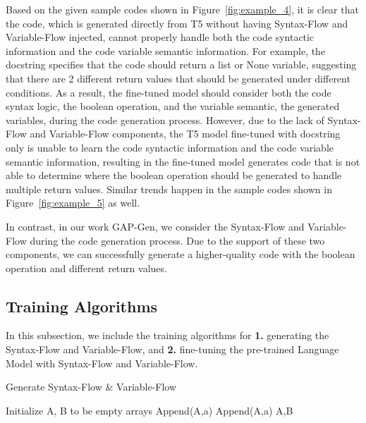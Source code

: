 \documentclass[11pt]{article}
\begin{document}
Based on the given sample codes shown in Figure~\ref{fig:example_4}, it is clear that the code, which is generated directly from T5 without having Syntax-Flow and Variable-Flow injected, cannot properly handle both the code syntactic information and the code variable semantic information. For example, the docstring specifies that the code should return a list or None variable, suggesting that there are 2 different return values that should be generated under different conditions. As a result, the fine-tuned model should consider both the code syntax logic, the boolean operation, and the variable semantic, the generated variables, during the code generation process. However, due to the lack of Syntax-Flow and Variable-Flow components, the T5 model fine-tuned with docstring only is unable to learn the code syntactic information and the code variable semantic information, resulting in the fine-tuned model generates code that is not able to determine where the boolean operation should be generated to handle multiple return values. Similar trends happen in the sample codes shown in Figure~\ref{fig:example_5} as well.


In contrast, in our work GAP-Gen, we consider the Syntax-Flow and Variable-Flow during the code generation process. Due to the support of these two components, we can successfully generate a higher-quality code with the boolean operation and different return values.
















\subsection{Training Algorithms}
In this subsection, we include the training algorithms for \textbf{1.} generating the Syntax-Flow and Variable-Flow, and \textbf{2.} fine-tuning the pre-trained Language Model with Syntax-Flow and Variable-Flow.
\label{sec:appendix}
\begin{algorithm}[ht!]
\caption{Generate Syntax-Flow \& Variable-Flow }\label{alg:wordy}
\begin{algorithmic}[1]
 \State Initialize A, B to be empty arrays
  \State 
  \State 
  \State Append(A,a)
  \State Append(A,a)
\EndFor
\State \Return A,B
\end{algorithmic}
\end{algorithm}
\end{document}
